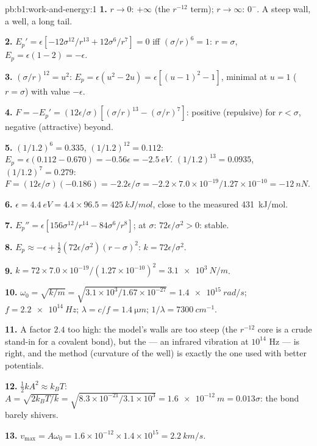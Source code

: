 \begin{solution}{pb:b1:work-and-energy:1}
\textbf{1.} $r \to 0$: $+\infty$ (the $r^{-12}$ term); $r \to \infty$:
$0^-$. A steep wall, a well, a long tail.

\textbf{2.} $E_p' = \epsilon[-12\sigma^{12}/r^{13} + 12\sigma^6/r^7] = 0$ iff
$(\sigma/r)^6 = 1$: $r = \sigma$, $E_p = \epsilon(1 - 2) = -\epsilon$.

\textbf{3.} $(\sigma/r)^{12} = u^2$: $E_p = \epsilon(u^2 - 2u) = \epsilon[(u - 1)^2
- 1]$, minimal at $u = 1$ ($r = \sigma$) with value $-\epsilon$.

\textbf{4.} $F = -E_p' = (12\epsilon/\sigma)[(\sigma/r)^{13} - (\sigma/r)^7]$:
positive (repulsive) for $r < \sigma$, negative (attractive) beyond.

\textbf{5.} $(1/1.2)^6 = 0.335$, $(1/1.2)^{12} = 0.112$: $E_p = \epsilon(0.112
- 0.670) = -0.56\epsilon = \qty{-2.5}{eV}$. $(1/1.2)^{13} = 0.0935$,
$(1/1.2)^7 = 0.279$: $F = (12\epsilon/\sigma)(-0.186) = -2.2\epsilon/\sigma =
-2.2 \times 7.0\times10^{-19}/1.27\times10^{-10} = \qty{-12}{nN}$.

\textbf{6.} $\epsilon = \qty{4.4}{eV} = 4.4 \times 96.5 = \qty{425}{kJ/mol}$,
close to the measured \qty{431}{kJ/mol}.

\textbf{7.} $E_p'' = \epsilon[156\sigma^{12}/r^{14} - 84\sigma^6/r^8]$; at
$\sigma$: $72\epsilon/\sigma^2 > 0$: stable.

\textbf{8.} $E_p \approx -\epsilon + \tfrac12(72\epsilon/\sigma^2)(r - \sigma)^2$:
$k = 72\epsilon/\sigma^2$.

\textbf{9.} $k = 72 \times 7.0\times10^{-19}/(1.27\times10^{-10})^2 =
\qty{3.1e3}{N/m}$.

\textbf{10.} $\omega_0 = \sqrt{k/m} = \sqrt{3.1\times10^3/1.67\times10^{-27}} =
\qty{1.4e15}{rad/s}$; $f = \qty{2.2e14}{Hz}$; $\lambda = c/f = \qty{1.4}{\micro m}$;
$1/\lambda = \qty{7300}{cm^{-1}}$.

\textbf{11.} A factor $2.4$ too high: the model's walls are too steep
(the $r^{-12}$ core is a crude stand-in for a covalent bond), but the
 --- an infrared vibration at $10^{14}$ Hz --- is
right, and the method (curvature of the well) is exactly the one used
with better potentials.

\textbf{12.} $\tfrac12 kA^2 \approx k_BT$: $A = \sqrt{2k_BT/k} = \sqrt{8.3\times
10^{-21}/3.1\times10^3} = \qty{1.6e-12}{m} = 0.013\sigma$: the bond
barely shivers.

\textbf{13.} $v_{\max} = A\omega_0 = 1.6\times10^{-12} \times 1.4\times10^{15}
= \qty{2.2}{km/s}$.


\end{solution}
